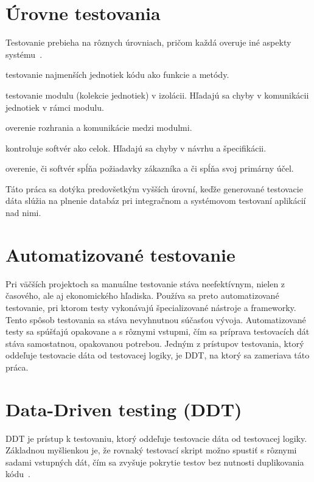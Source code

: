 \section{Úrovne testovania}
Testovanie prebieha na rôznych úrovniach, pričom každá overuje iné aspekty systému~\cite{Ammann2016}.

\begin{description}[leftmargin=0pt]
    \item[Jednotkové testovanie (unit testing)] testovanie najmenších jednotiek kódu ako funkcie a metódy.
    \item[Testovanie modulov (module testing)] testovanie modulu (kolekcie jednotiek) v izolácii. Hľadajú sa chyby v komunikácii jednotiek v rámci modulu. 
    \item[Integračné testovanie (integration testing)] overenie rozhrania a komunikácie medzi modulmi. 
    \item[Testovanie systému (system testing)] kontroluje softvér ako celok. Hľadajú sa chyby v návrhu a špecifikácii.
    \item[Akceptačné testovanie (acceptance testing)] overenie, či softvér spĺňa požiadavky zákazníka a či spĺňa svoj primárny účel.
\end{description}

Táto práca sa dotýka predovšetkým vyšších úrovní, keďže generované testovacie dáta slúžia na plnenie databáz pri integračnom a systémovom testovaní aplikácií nad nimi.

\section{Automatizované testovanie}
Pri väčších projektoch sa manuálne testovanie stáva neefektívnym, nielen z časového, ale aj ekonomického hľadiska. Používa sa preto automatizované testovanie, pri ktorom testy vykonávajú špecializované nástroje a frameworky. Tento spôsob testovania sa stáva nevyhnutnou súčasťou vývoja. Automatizované testy sa spúšťajú opakovane a s rôznymi vstupmi, čím sa príprava testovacích dát stáva samostatnou, opakovanou potrebou. Jedným z prístupov testovania, ktorý oddeľuje testovacie dáta od testovacej logiky, je DDT, na ktorý sa zameriava táto práca.

\section{Data-Driven testing (DDT)}
DDT je prístup k testovaniu, ktorý oddeľuje testovacie dáta od testovacej logiky. Základnou myšlienkou je, že rovnaký testovací skript možno spustiť s rôznymi sadami vstupných dát, čím sa zvyšuje pokrytie testov bez nutnosti duplikovania kódu~\cite{Laukkanen2006}.

